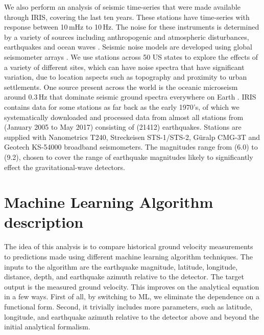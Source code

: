 \documentclass[twocolumn, aps, superscriptaddress]{revtex4}
\newcommand{\rednote}[1]{{\color{red} (#1)}}
\begin{document}
We also perform an analysis of seismic time-series that were made available through IRIS, covering the last ten years. These stations have time-series with response between 10\,mHz to 10\,Hz. The noise for these instruments is determined by a variety of sources including anthropogenic and atmospheric disturbances, earthquakes and ocean waves \cite{BCB2006}. 
Seismic noise models are developed using global seismometer arrays  \cite{Pet1993,BDE2004,McEA2009}.
We use stations across 50 US states to explore the effects of a variety of different sites, which can have noise spectra that have significant variation, due to location aspects such as topography and proximity to urban settlements.
One source present across the world is the oceanic microseism around 0.3\,Hz that dominate seismic ground spectra everywhere on Earth \cite{HMS1963,ToLa1968,Ces1994,FKK1998}. IRIS contains data for some stations as far back as the early 1970's, of which we systematically downloaded and processed data from almost all stations from \rednote{January 2005 to May 2017} consisting of  \rednote{21412} earthquakes. Stations are supplied with Nanometrics T240, Streckeisen STS-1/STS-2, G\"uralp CMG-3T and Geotech KS-54000 broadband seismometers. 
The magnitudes range from \rednote{6.0} to \rednote{9.2}, chosen to cover the range of earthquake magnitudes likely to significantly effect the gravitational-wave detectors.


\section{Machine Learning Algorithm description} \label{sec:MLA}

The idea of this analysis is to compare historical ground velocity measurements to predictions made using different machine learning algorithm techniques. 
The inputs to the algorithm are the earthquake magnitude, latitude, longitude, distance, depth, and earthquake azimuth relative to the detector. 
The target output is the measured ground velocity.
This improves on the analytical equation in a few ways.
First of all, by switching to ML, we eliminate the dependence on a functional form.
Second, it trivially includes more parameters, such as latitude, longitude, and earthquake azimuth relative to the detector above and beyond the initial analytical formalism. 
\end{document}
